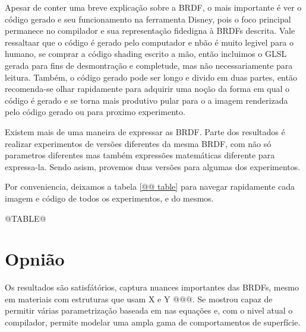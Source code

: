 %
%




Apesar de conter uma breve explicação sobre a BRDF, o mais importante é ver o código gerado e seu funcionamento na ferramenta Disney, pois o foco principal permanece no compilador e sua representação fidedigna à BRDFs descrita.  Vale ressaltaar que o código é gerado pelo computador e nbão é muito legivel para o humano, se comprar a código shading escrito a mão, então incluimos o GLSL gerada para fins de desmontração e completude, mas não necessariamente para leitura. Também, o código gerado pode ser longo e divido em duas partes, então recomenda-se olhar rapidamente para adquirir uma noção da forma em qual o código é gerado e se torna mais produtivo pular para o a imagem renderizada pelo código gerado ou para proximo experimento.

Existem mais de uma maneira de expressar as BRDF. Parte dos resultados é realizar experimentos de versões diferentes da mesma BRDF, com não só parametros diferentes mas também expressões matemáticas diferente para expressa-la. Sendo asism, provemos duas versões para algumas dos experimentos.


Por conveniencia, deixamos a tabela \autoref{@@ table} para navegar rapidamente cada imagem e código de todos os experimentos, e  do mesmos.


@TABLE@


\section{Opnião}
Os resultados são satisfátórios, captura nuances importantes das BRDFs, mesmo em materiais com estruturas que usam X e Y @@@. Se mostrou capaz de permitir várias parametrização baseada em nas equações e, com o nivel atual o compilador, permite modelar uma ampla gama de comportamentos de superfície.
